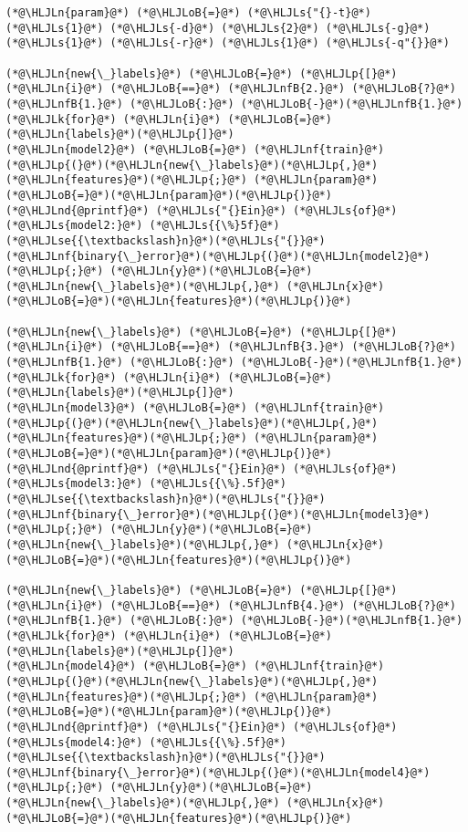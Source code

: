 \documentclass[12pt,a4paper]{article}
\newcommand{\HLJLk}[1]{\textcolor[RGB]{148,91,176}{\textbf{#1}}}
\newcommand{\HLJLn}[1]{#1}
\newcommand{\HLJLnd}[1]{\textcolor[RGB]{214,102,97}{#1}}
\newcommand{\HLJLnf}[1]{\textcolor[RGB]{66,102,213}{#1}}
\newcommand{\HLJLs}[1]{\textcolor[RGB]{201,61,57}{#1}}
\newcommand{\HLJLse}[1]{\textcolor[RGB]{59,151,46}{#1}}
\newcommand{\HLJLnfB}[1]{\textcolor[RGB]{59,151,46}{#1}}
\newcommand{\HLJLoB}[1]{\textcolor[RGB]{102,102,102}{\textbf{#1}}}
\newcommand{\HLJLp}[1]{#1}
\begin{document}
\begin{lstlisting}
(*@\HLJLn{param}@*) (*@\HLJLoB{=}@*) (*@\HLJLs{"{}-t}@*) (*@\HLJLs{1}@*) (*@\HLJLs{-d}@*) (*@\HLJLs{2}@*) (*@\HLJLs{-g}@*) (*@\HLJLs{1}@*) (*@\HLJLs{-r}@*) (*@\HLJLs{1}@*) (*@\HLJLs{-q"{}}@*)

(*@\HLJLn{new{\_}labels}@*) (*@\HLJLoB{=}@*) (*@\HLJLp{[}@*)(*@\HLJLn{i}@*) (*@\HLJLoB{==}@*) (*@\HLJLnfB{2.}@*) (*@\HLJLoB{?}@*) (*@\HLJLnfB{1.}@*) (*@\HLJLoB{:}@*) (*@\HLJLoB{-}@*)(*@\HLJLnfB{1.}@*) (*@\HLJLk{for}@*) (*@\HLJLn{i}@*) (*@\HLJLoB{=}@*) (*@\HLJLn{labels}@*)(*@\HLJLp{]}@*)
(*@\HLJLn{model2}@*) (*@\HLJLoB{=}@*) (*@\HLJLnf{train}@*)(*@\HLJLp{(}@*)(*@\HLJLn{new{\_}labels}@*)(*@\HLJLp{,}@*) (*@\HLJLn{features}@*)(*@\HLJLp{;}@*) (*@\HLJLn{param}@*)(*@\HLJLoB{=}@*)(*@\HLJLn{param}@*)(*@\HLJLp{)}@*)
(*@\HLJLnd{@printf}@*) (*@\HLJLs{"{}Ein}@*) (*@\HLJLs{of}@*) (*@\HLJLs{model2:}@*) (*@\HLJLs{{\%}5f}@*)(*@\HLJLse{{\textbackslash}n}@*)(*@\HLJLs{"{}}@*) (*@\HLJLnf{binary{\_}error}@*)(*@\HLJLp{(}@*)(*@\HLJLn{model2}@*)(*@\HLJLp{;}@*) (*@\HLJLn{y}@*)(*@\HLJLoB{=}@*)(*@\HLJLn{new{\_}labels}@*)(*@\HLJLp{,}@*) (*@\HLJLn{x}@*)(*@\HLJLoB{=}@*)(*@\HLJLn{features}@*)(*@\HLJLp{)}@*)

(*@\HLJLn{new{\_}labels}@*) (*@\HLJLoB{=}@*) (*@\HLJLp{[}@*)(*@\HLJLn{i}@*) (*@\HLJLoB{==}@*) (*@\HLJLnfB{3.}@*) (*@\HLJLoB{?}@*) (*@\HLJLnfB{1.}@*) (*@\HLJLoB{:}@*) (*@\HLJLoB{-}@*)(*@\HLJLnfB{1.}@*) (*@\HLJLk{for}@*) (*@\HLJLn{i}@*) (*@\HLJLoB{=}@*) (*@\HLJLn{labels}@*)(*@\HLJLp{]}@*)
(*@\HLJLn{model3}@*) (*@\HLJLoB{=}@*) (*@\HLJLnf{train}@*)(*@\HLJLp{(}@*)(*@\HLJLn{new{\_}labels}@*)(*@\HLJLp{,}@*) (*@\HLJLn{features}@*)(*@\HLJLp{;}@*) (*@\HLJLn{param}@*)(*@\HLJLoB{=}@*)(*@\HLJLn{param}@*)(*@\HLJLp{)}@*)
(*@\HLJLnd{@printf}@*) (*@\HLJLs{"{}Ein}@*) (*@\HLJLs{of}@*) (*@\HLJLs{model3:}@*) (*@\HLJLs{{\%}.5f}@*)(*@\HLJLse{{\textbackslash}n}@*)(*@\HLJLs{"{}}@*) (*@\HLJLnf{binary{\_}error}@*)(*@\HLJLp{(}@*)(*@\HLJLn{model3}@*)(*@\HLJLp{;}@*) (*@\HLJLn{y}@*)(*@\HLJLoB{=}@*)(*@\HLJLn{new{\_}labels}@*)(*@\HLJLp{,}@*) (*@\HLJLn{x}@*)(*@\HLJLoB{=}@*)(*@\HLJLn{features}@*)(*@\HLJLp{)}@*)

(*@\HLJLn{new{\_}labels}@*) (*@\HLJLoB{=}@*) (*@\HLJLp{[}@*)(*@\HLJLn{i}@*) (*@\HLJLoB{==}@*) (*@\HLJLnfB{4.}@*) (*@\HLJLoB{?}@*) (*@\HLJLnfB{1.}@*) (*@\HLJLoB{:}@*) (*@\HLJLoB{-}@*)(*@\HLJLnfB{1.}@*) (*@\HLJLk{for}@*) (*@\HLJLn{i}@*) (*@\HLJLoB{=}@*) (*@\HLJLn{labels}@*)(*@\HLJLp{]}@*)
(*@\HLJLn{model4}@*) (*@\HLJLoB{=}@*) (*@\HLJLnf{train}@*)(*@\HLJLp{(}@*)(*@\HLJLn{new{\_}labels}@*)(*@\HLJLp{,}@*) (*@\HLJLn{features}@*)(*@\HLJLp{;}@*) (*@\HLJLn{param}@*)(*@\HLJLoB{=}@*)(*@\HLJLn{param}@*)(*@\HLJLp{)}@*)
(*@\HLJLnd{@printf}@*) (*@\HLJLs{"{}Ein}@*) (*@\HLJLs{of}@*) (*@\HLJLs{model4:}@*) (*@\HLJLs{{\%}.5f}@*)(*@\HLJLse{{\textbackslash}n}@*)(*@\HLJLs{"{}}@*) (*@\HLJLnf{binary{\_}error}@*)(*@\HLJLp{(}@*)(*@\HLJLn{model4}@*)(*@\HLJLp{;}@*) (*@\HLJLn{y}@*)(*@\HLJLoB{=}@*)(*@\HLJLn{new{\_}labels}@*)(*@\HLJLp{,}@*) (*@\HLJLn{x}@*)(*@\HLJLoB{=}@*)(*@\HLJLn{features}@*)(*@\HLJLp{)}@*)


\end{lstlisting}
\end{document}

